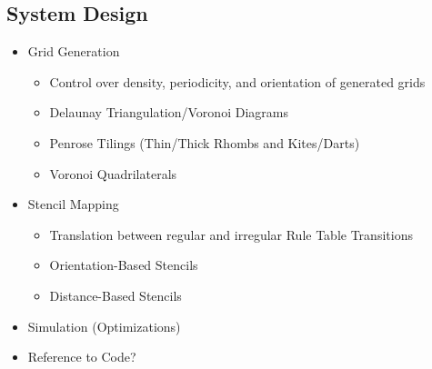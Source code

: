 \documentclass[a4paper, 11pt]{article}
\begin{document}
\subsection*{System Design}
\begin{itemize}

\item Grid Generation
\begin{itemize}
\item Control over density, periodicity, and orientation of generated grids

\item Delaunay Triangulation/Voronoi Diagrams

\item Penrose Tilings (Thin/Thick Rhombs and Kites/Darts)

\item Voronoi Quadrilaterals
\end{itemize}

\item Stencil Mapping

\begin{itemize}
\item Translation between regular and irregular Rule Table Transitions

\item Orientation-Based Stencils

\item Distance-Based Stencils
\end{itemize}

\item Simulation (Optimizations)

\item Reference to Code?

\end{itemize}
\end{document}
